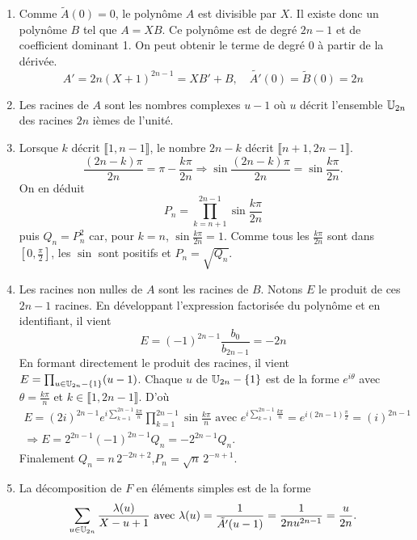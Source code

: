 \begin{enumerate}
\item Comme $\tilde{A}(0)=0$, le polynôme $A$ est divisible par $X$. Il existe donc un polynôme $B$ tel que $A=XB$. Ce polynôme est de degré $2n-1$ et de coefficient dominant 1. On peut obtenir le terme de degré 0 à partir de la dérivée.
\[A'=2n(X+1)^{2n-1}=XB'+B,\quad\tilde{A'}(0)=\tilde{B}(0)=2n\]
\item Les racines de $A$ sont les nombres complexes $u-1$ où $u$ décrit l'ensemble $\mathbb{U}_{2n}$ des racines $2n$ ièmes de l'unité.
\item Lorsque $k$ décrit $\llbracket 1, n-1 \rrbracket$, le nombre $2n-k$ décrit $\llbracket n+1, 2n-1\rrbracket$.
\[
\frac{(2n-k)\pi}{2n}=\pi-\frac{k\pi}{2n}
\Rightarrow
\sin\frac{(2n-k)\pi}{2n}=\sin \frac{k\pi}{2n} .
\]
On en déduit 
\[
P_{n}=\prod_{k=n+1}^{2n-1}\sin \frac{k\pi}{2n}
\]
puis $Q_{n}=P_{n}^{2}$ car, pour $k=n$, $\sin \frac{k\pi}{2n}=1$.\newline
Comme tous les $\frac{k\pi}{2n}$ sont dans $[0,\frac{\pi}{2}]$, les $\sin$ sont positifs et $P_{n}=\sqrt{Q_{n}}$.

\item Les racines non nulles de $A$ sont les racines de $B$. Notons $E$ le produit de ces $2n-1$ racines. En développant l'expression factorisée du polynôme et en identifiant, il vient 
\[
E = (-1)^{2n-1}\frac{b_{0}}{b_{2n-1}} = -2n
\]
En formant directement le produit des racines, il vient $E = \prod_{u\in \mathbb{U}_{2n}-\{1\}}(u-1)$. Chaque $u$ de $\mathbb{U}_{2n}-\{1\}$ est de la forme $e^{i\theta}$ avec $\theta=\frac{k\pi}{n}$ et $k\in \llbracket 1, 2n-1\rrbracket$. D'où
\begin{multline*}
E = (2i)^{2n-1}e^{i\sum_{k=1}^{2n-1}\frac{k\pi}{n}}\prod_{k=1}^{2n - 1}\sin \frac{k\pi}{n} \text{ avec }
e^{i\sum_{k=1}^{2n-1}\frac{k\pi}{n}} = e^{i(2n-1)\frac{\pi}{2}}=(i)^{2n-1}\\
\Rightarrow E = 2^{2n-1}(-1)^{2n-1}Q_{n}=-2^{2n-1}Q_{n}.
\end{multline*}
Finalement $Q_{n}=n\,2^{-2n+2}$,$P_{n}=\sqrt{n}\,2^{-n+1}$.
\item La décomposition de $F$ en éléments simples est de la forme
\[
\sum _{u\in \mathbb{U}_{2n}}\frac{\lambda(u)}{X-u+1}
 \text{ avec }
\lambda(u)=\frac{1}{\tilde{A'}(u-1)}=\frac{1}{2nu^{2n-1}}=\frac{u}{2n}. 
 \]
\end{enumerate}

